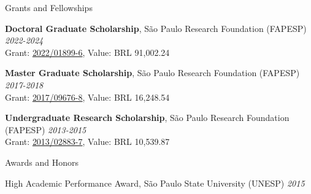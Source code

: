 \documentclass{resume}
\begin{document}

\begin{rSection}{Grants and Fellowships} 

{\bf Doctoral Graduate Scholarship}{, São Paulo Research Foundation (FAPESP)
} \hfill{\em 2022-2024} 
\\ Grant: \href{https://bv.fapesp.br/en/bolsas/203713/landscape-structure-as-a-predictor-of-taxonomic-and-functional-diversity-of-amphibians-in-the-atlant/}{2022/01899-6}, Value: BRL 91,002.24

{\bf Master Graduate Scholarship}{, São Paulo Research Foundation (FAPESP)
} \hfill{\em 2017-2018} 
\\ Grant: \href{https://bv.fapesp.br/en/bolsas/172826/effect-of-landscape-modifications-and-climate-changes-on-the-persistence-of-amphibians-in-the-atlant/}{2017/09676-8}, Value: BRL 16,248.54

{\bf Undergraduate Research Scholarship}{, São Paulo Research Foundation (FAPESP)
} \hfill{\em 2013-2015} 
\\ Grant: \href{https://bv.fapesp.br/en/bolsas/142421/effect-of-fragmentation-on-the-persistence-of-anuran-amphibians-amphibia-anura-within-the-atlanti/}{2013/02883-7}, Value: BRL 10,539.87

\end{rSection}


\begin{rSection}{Awards and Honors} 

{High Academic Performance Award, São Paulo State University (UNESP)} \hfill{\em 2015}

\end{rSection}

\end{document}
